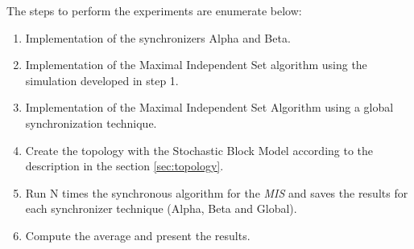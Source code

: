 The steps to perform the experiments are enumerate below:

\begin{enumerate}
\item Implementation of the synchronizers Alpha and Beta.
\item Implementation of the Maximal Independent Set algorithm using the simulation developed in step 1.
\item Implementation of the Maximal Independent Set Algorithm using a global synchronization technique.
\item Create the topology with the Stochastic Block Model according to the description in the section \ref{sec:topology}.
\item Run N times the synchronous algorithm for the \textit{MIS} and saves the results for each synchronizer technique (Alpha, Beta and Global).
\item Compute the average and present the results.
\end{enumerate}




